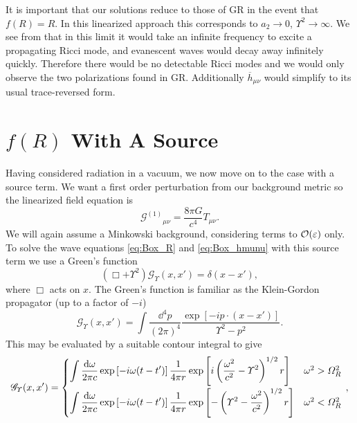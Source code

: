 It is important that our solutions reduce to those of GR in the event that $f(R) = R$. In this linearized approach this corresponds to $a_2 \rightarrow 0$, $\Upsilon^2 \rightarrow \infty$. We see from  that in this limit it would take an infinite frequency to excite a propagating Ricci mode, and evanescent waves would decay away infinitely quickly. Therefore there would be no detectable Ricci modes and we would only observe the two polarizations found in GR. Additionally $\overline{h}_{\mu\nu}$ would simplify to its usual trace-reversed form.

\section{$f(R)$ With A Source}

Having considered radiation in a vacuum, we now move on to the case with a source term. We want a first order perturbation from our background metric so the linearized field equation is
\begin{equation}
{\mathcal{G}^{(1)}}_{\mu\nu} = \frac{8\pi G}{c^4}T_{\mu\nu}.
\end{equation}
We will again assume a Minkowski background, considering terms to $\mathcal{O}({\varepsilon})$ only. To solve the wave equations \eqref{eq:Box_R} and \eqref{eq:Box_hmunu} with this source term we use a Green's function
\begin{equation}
\left(\Box + \Upsilon^2\right)\mathscr{G}_\Upsilon(x, x') = \delta(x - x'),
\end{equation}
where $\Box$ acts on $x$. The Green's function is familiar as the Klein-Gordon propagator (up to a factor of $-i$)\cite{Peskin1995a}
\begin{equation}
\mathscr{G}_\Upsilon(x, x') = \int \frac{\dd^4 p}{(2\pi)^4} \frac{\exp\left[-ip\cdot(x-x')\right]}{\Upsilon^2 - p^2}.
\end{equation}
This may be evaluated by a suitable contour integral to give
\begin{equation}
\mathscr{G}_\Upsilon(x, x') =
\begin{cases}
{\displaystyle \int{\frac{\dd \omega}{2\pi c} \exp\left[-i\omega(t-t')\right]\recip{4\pi r}\exp\left[i\left(\frac{\omega^2}{c^2} - \Upsilon^2\right)^{1/2}r\right]}} & \omega^2 > \Omega_R^2\vspace{0.8mm}\\
{\displaystyle \int{\frac{\dd \omega}{2\pi c} \exp\left[-i\omega(t-t')\right]\recip{4\pi r}\exp\left[-\left(\Upsilon^2 - \frac{\omega^2}{c^2}\right)^{1/2}r\right]}} & \omega^2 < \Omega_R^2\vspace{0.8mm}
\end{cases}\, ,
\label{eq:Green}
\end{equation}
